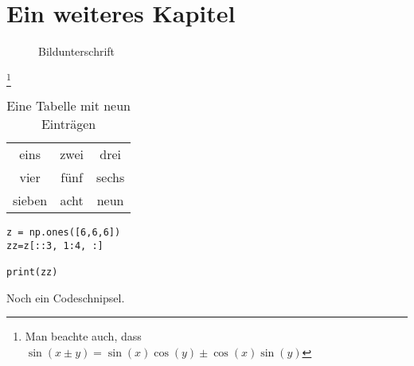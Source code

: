 
\chapter{Ein weiteres Kapitel}

\begin{figure}[h]
  \caption{Bildunterschrift}
  \label{fig:introduction}
\end{figure}

\Blindtext\footnote{Man beachte auch, dass $\sin(x\pm y) = \sin(x)\cos(y) \pm \cos(x)\sin(y)$}

\begin{table}[h]
  \centering
  \begin{tabular}{ccc}
  \toprule
  eins & zwei & drei\\
  vier & fünf & sechs\\
  sieben & acht & neun\\
  \bottomrule
  \end{tabular}
  \caption{Eine Tabelle mit neun Einträgen}
  \label{tab:tabelle3}
\end{table}

\begin{listing}[H]
\begin{verbatim}
z = np.ones([6,6,6])
zz=z[::3, 1:4, :]

print(zz)
\end{verbatim}
\caption{Noch ein Codeschnipsel.}
\label{lst:example}
\end{listing}